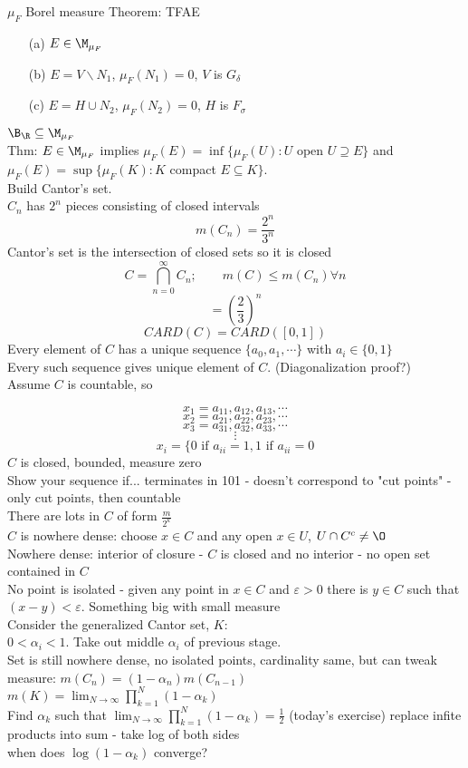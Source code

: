 $\mu_F$ Borel measure
Theorem: TFAE	
\begin{enumerate}
	\item[(a)] $E \in \M_{\mu_F}$
	\item[(b)] $E = V \backslash N_1$, $\mu_F(N_1)=0$, $V$ is $G_\delta$
	\item[(c)] $E = H \cup N_2$, $\mu_F(N_2)=0$, $H$ is $F_\sigma$
\end{enumerate}

$\B_\R \subseteq \M_{\mu_F}$
\\
Thm: $E \in \M_{\mu_F}$ implies $\mu_F(E)=\inf\{ \mu_F(U): U $ open $ U \supseteq E\}$ and $\mu_F(E)=\sup\{\mu_F(K): K $ compact $E \subseteq K \}$. \\

Build Cantor's set.\\

$C_n$ has $2^n$ pieces consisting of closed intervals\\
\[
m(C_n) = \frac{2^n}{3^n}
\]
Cantor's set is the intersection of closed sets so it is closed
\[
C = \bigcap_{n=0}^\infty C_n; \qquad m(C) \leq m(C_n) \forall n
\]
\[
= \left(\frac{2}{3}\right)^n
\]
\[
CARD(C) = CARD([0,1])
\]
Every element of $C$ has a unique sequence $\{a_0, a_1, \cdots \}$ with $a_i \in \{0, 1\}$ \\
Every such sequence gives unique element of $C$. (Diagonalization proof?)\\
Assume $C$ is countable, so 

\[
x_1 = a_{11}, a_{12}, a_{13},  \cdots
\]
\[
x_2 = a_{21}, a_{22}, a_{23},  \cdots
\]
\[
x_3 = a_{31}, a_{32}, a_{33},  \cdots
\]
\[
\vdots
\]
\[
x_i = \{ 0 \text{ if } a_{ii} = 1, 1 \text{ if } a_{ii}=0
\]
$C$ is closed, bounded, measure zero\\
Show your sequence if... terminates in 101 - doesn't correspond to "cut points" - only cut points, then countable\\
There are lots in $C$ of form $\frac{m}{2^k}$\\
$C$ is nowhere dense: choose $x \in C$ and any open $x \in U$, $U \cap C^c \neq \O$\\
Nowhere dense: interior of closure - $C$ is closed and no interior - no open set contained in $C$
\\
No point is isolated - given any point in $x \in C$ and $\varepsilon >0$ there is $y \in C$ such that $(x-y) < \varepsilon$. 
Something big with small measure\\
Consider the generalized Cantor set, $K$:\\
$0 < \alpha_i < 1$. Take out middle $\alpha_i$ of previous stage.\\
Set is still nowhere dense, no isolated points, cardinality same, but can tweak measure: $m(C_n)= (1-\alpha_n ) m(C_{n-1})$\\
$m(K) = \lim_{N \rightarrow \infty} \prod_{k=1}^N (1 - \alpha_k)$
\\
Find $\alpha_k$ such that $\lim_{N \rightarrow \infty} \prod_{k=1}^N (1 - \alpha_k)= \frac{1}{2}$ (today's exercise)
replace infite products into sum - take log of both sides\\
when does $\log(1 - \alpha_k)$ converge?